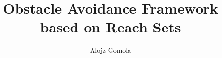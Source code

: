 \documentclass[a4paper,narrowmargins,11pt,twoside,openright,onehalfspaced,singlespacednotes]{fcup-thesis}
\author{Alojz Gomola}
\title{Obstacle Avoidance Framework based on Reach Sets}
\theoremstyle{plain}
\theoremstyle{plain}
\theoremstyle{remark}
\begin{document}
\begin{preliminary}

\maketitle

\cleardoublepage


\begin{dedication}

\end{dedication}

\begin{acknowledgements}

\end{acknowledgements}



\begin{abstract}

\end{abstract}

\begin{abstract-pt}

\end{abstract-pt}





\tableofcontents

\listoftables

\listoffigures

\listofalgorithms

\newpage
\cleardoublepage

\end{preliminary}
\end{document}
